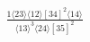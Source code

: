 \documentclass[varwidth, border=5pt]{standalone}
\begin{document}
\begin{my}
$\begin{gathered}
\scriptscriptstyle\frac{1⟨23⟩⟨12⟩[34]^2⟨14⟩}{⟨13⟩^3⟨24⟩[35]^2}
\end{gathered}$
\end{my}
\end{document}
